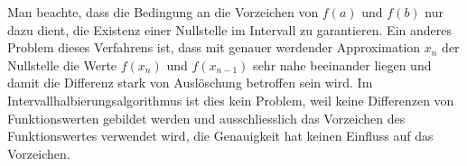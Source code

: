 Man beachte, dass die Bedingung an die Vorzeichen von $f(a)$ und $f(b)$
nur dazu dient, die Existenz einer Nullstelle im Intervall zu garantieren.
Ein anderes Problem dieses Verfahrens ist, dass mit genauer werdender
Approximation $x_n$ der Nullstelle die Werte $f(x_n)$ und $f(x_{n-1})$
sehr nahe beeinander liegen und damit die Differenz stark von 
Auslöschung betroffen sein wird.
Im Intervallhalbierungsalgorithmus ist dies kein Problem, weil keine
Differenzen von Funktionswerten gebildet werden und ausschliesslich das
Vorzeichen des Funktionswertes verwendet wird, die Genauigkeit hat
keinen Einfluss auf das Vorzeichen.
%



